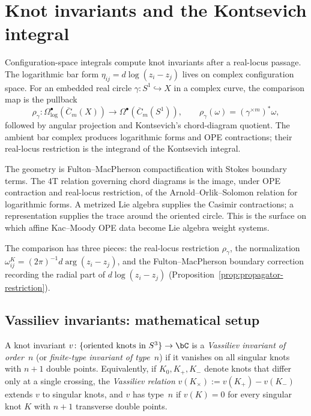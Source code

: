 \chapter{Knot invariants and the Kontsevich integral}
\label{ch:kontsevich-integral}


Configuration-space integrals compute knot invariants after a real-locus
passage. The logarithmic bar form $\eta_{ij}=d\log(z_i-z_j)$ lives on complex
configuration space. For an embedded real circle
$\gamma:S^1\hookrightarrow X$ in a complex curve, the comparison map is the
pullback
\[
\rho_\gamma:\Omega^\bullet_{\log}(\overline{C}_m(X))
\longrightarrow
\Omega^\bullet(\overline{C}_m(S^1)),
\qquad
\rho_\gamma(\omega)=(\gamma^{\times m})^*\omega ,
\]
followed by angular projection and Kontsevich's chord-diagram quotient. The
ambient bar complex produces logarithmic forms and OPE contractions; their
real-locus restriction is the integrand of the Kontsevich integral.

The geometry is Fulton--MacPherson compactification with Stokes boundary terms.
The 4T relation governing chord diagrams is the image, under OPE contraction
and real-locus restriction, of the Arnold--Orlik--Solomon relation for
logarithmic forms. A metrized Lie algebra supplies the Casimir contractions; a
representation supplies the trace around the oriented circle. This is the
surface on which affine Kac--Moody OPE data become Lie algebra weight systems.

The comparison has three pieces: the real-locus restriction $\rho_\gamma$, the
normalization $\omega_{ij}^{K}=(2\pi)^{-1}d\arg(z_i-z_j)$, and the
Fulton--MacPherson boundary correction recording the radial part of
$d\log(z_i-z_j)$ (Proposition~\ref{prop:propagator-restriction}).

\section{Vassiliev invariants: mathematical setup}
\label{sec:vassiliev-setup}

\begin{definition}
\label{def:vassiliev-invariant}
A knot invariant $v\colon \{\text{oriented knots in } S^3\} \to \bC$
is a \emph{Vassiliev invariant of order~$n$} (or \emph{finite-type
invariant of type~$n$}) if it vanishes on all singular knots with
$n+1$ double points. Equivalently, if $K_0, K_+, K_-$ denote knots
that differ only at a single crossing, the \emph{Vassiliev relation}
$v(K_\times) := v(K_+) - v(K_-)$ extends $v$ to singular knots,
and $v$ has type~$n$ if $v(K)=0$ for every singular knot $K$ with
$n+1$ transverse double points.
\end{definition}

